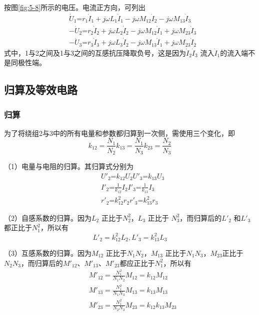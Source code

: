 \documentclass{book}
\begin{document}
按图\ref{fig:5-8}所示的电压。电流正方向，可列出
\begin{align}
& {{{\dot{U}}}_{1}}\text{=}{{r}_{1}}{{{\dot{I}}}_{1}}+j\omega {{L}_{1}}{{{\dot{I}}}_{1}}-j\omega {{M}_{12}}{{{\dot{I}}}_{2}}-j\omega {{M}_{13}}{{{\dot{I}}}_{3}} \\ 
& -{{{\dot{U}}}_{2}}\text{=}{{r}_{2}}{{{\dot{I}}}_{2}}+j\omega {{L}_{2}}{{{\dot{I}}}_{2}}-j\omega {{M}_{12}}{{{\dot{I}}}_{1}}+j\omega {{M}_{23}}{{{\dot{I}}}_{3}} \\ 
& -{{{\dot{U}}}_{3}}\text{=}{{r}_{3}}{{{\dot{I}}}_{3}}+j\omega {{L}_{3}}{{{\dot{I}}}_{2}}-j\omega {{M}_{13}}{{{\dot{I}}}_{1}}+j\omega {{M}_{23}}{{{\dot{I}}}_{2}} 
\label{5-30}
\end{align}
式中，1与2之间及1与3之间的互感抗压降取负号，这是因为${{\dot{I}}_{2}}{{\dot{I}}_{3}}$ 流入${{\dot{I}}_{1}}$的流入端不是同极性端。

\subsection{归算及等效电路}
\subsubsection{归算}
为了将绕组2与3中的所有电量和参数都归算到一次侧，需使用三个变化，即
\begin{equation}
{{k}_{12}}=\frac{{{N}_{1}}}{{{N}_{2}}}{{k}_{13}}=\frac{{{N}_{1}}}{{{N}_{3}}}{{k}_{23}}=\frac{{{N}_{2}}}{{{N}_{3}}}
\label{5-31}
\end{equation}

（1）电量与电阻的归算。其归算式分别为
\begin{align}
& {{{{U}'}}_{2}}\text{=}{{k}_{12}}{{U}_{2}}{{{{U}'}}_{3}}\text{=}{{k}_{13}}{{U}_{3}} \\ 
& {{{{I}'}}_{2}}\text{=}\frac{1}{{{k}_{12}}}{{I}_{2}}{{{{I}'}}_{3}}\text{=}\frac{1}{{{k}_{13}}}{{I}_{3}} \\ 
& {{{{r}'}}_{2}}\text{=}k_{12}^{2}{{r}_{2}}{{{{r}'}}_{3}}\text{=}k_{13}^{2}{{r}_{3}} 
\label{5-32}
\end{align}

（2）自感系数的归算。因为${{L}_{2}}$ 正比于$N_{2}^{2}$，${{L}_{3}}$ 正比于
$N_{3}^{2}$，而归算后的${{{L}'}_{2}}$ 和${{{L}'}_{3}}$都正比于$N_{1}^{2}$，所以有
\begin{equation}
{{{L}'}_{2}}=k_{12}^{2}{{L}_{2}},{{{L}'}_{3}}=k_{13}^{2}{{L}_{3}}
\label{5-33}
\end{equation}

（3）互感系数的归算。因为${{M}_{12}}$ 正比于${{N}_{1}}{{N}_{2}}$，${{M}_{13}}$ 正比于${{N}_{1}}{{N}_{3}}$，${{M}_{23}}$正比于${{N}_{2}}{{N}_{3}}$，而归算后的${{{M}'}_{12}}$、${{{M}'}_{13}}$、${{{M}'}_{23}}$都应正比于$N_{1}^{2}$，所以有
\begin{align}
& {{{{M}'}}_{12}}=\frac{N_{1}^{2}}{{{N}_{1}}{{N}_{2}}}{{M}_{12}}={{k}_{12}}{{M}_{12}} \\ 
& {{{{M}'}}_{13}}=\frac{N_{1}^{2}}{{{N}_{1}}{{N}_{3}}}{{M}_{13}}={{k}_{13}}{{M}_{13}} \\ 
& {{{{M}'}}_{23}}=\frac{N_{1}^{2}}{{{N}_{2}}{{N}_{3}}}{{M}_{23}}={{k}_{12}}{{k}_{13}}{{M}_{23}} 
\label{5-34}
\end{align}
\end{document}
